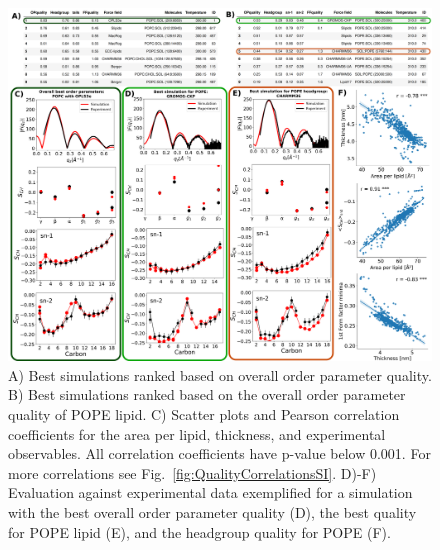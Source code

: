 \documentclass[fleqn,10pt]{wlscirep}
\begin{document}
\begin{figure}[tbp]
    \centering
    \includegraphics[width=180mm]{Figures/quality3.pdf}
    \caption{ A) Best simulations ranked based on overall order parameter quality.
    B) Best simulations ranked based on the overall order parameter quality of POPE lipid. 
    C) Scatter plots and Pearson correlation coefficients for the area per lipid, thickness, and experimental observables. 
    All correlation coefficients have p-value below 0.001. For more correlations see Fig.~\ref{fig:QualityCorrelationsSI}.
    D)-F) Evaluation against experimental data exemplified for a simulation with the best overall order parameter quality (D), the best quality for POPE lipid (E), and the headgroup quality for POPE (F).
    }
    \label{fig:quality}
\end{figure}
\end{document}
